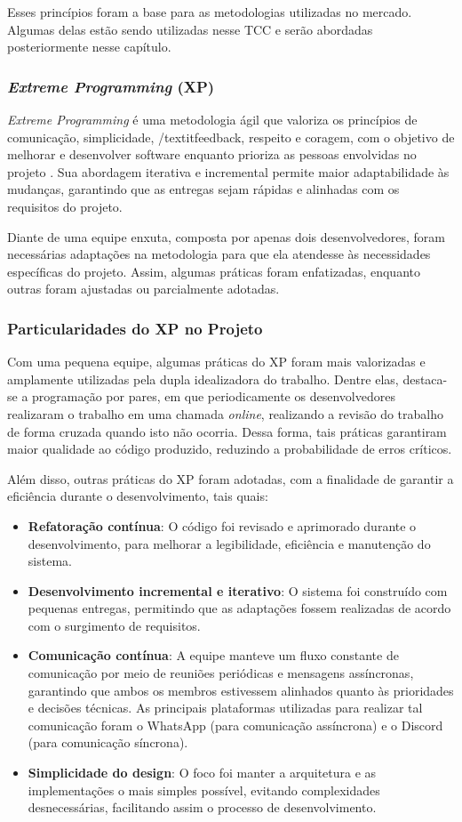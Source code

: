 Esses princípios foram a base para as metodologias utilizadas no mercado. Algumas delas estão sendo utilizadas nesse TCC e serão abordadas posteriormente nesse capítulo.

\subsubsection{\textit{Extreme Programming} (XP)}
\textit{Extreme Programming} é uma metodologia ágil que valoriza os princípios de comunicação, simplicidade, /textit{feedback}, respeito e coragem, com o objetivo de melhorar e desenvolver software enquanto prioriza as pessoas envolvidas no projeto \cite{extremeprogramming}. Sua abordagem iterativa e incremental permite maior adaptabilidade às mudanças, garantindo que as entregas sejam rápidas e alinhadas com os requisitos do projeto. 

Diante de uma equipe enxuta, composta por apenas dois desenvolvedores, foram necessárias adaptações na metodologia para que ela atendesse às necessidades específicas do projeto. Assim, algumas práticas foram enfatizadas, enquanto outras foram ajustadas ou parcialmente adotadas.

\subsubsection{Particularidades do XP no Projeto}
Com uma pequena equipe, algumas práticas do XP foram mais valorizadas e amplamente utilizadas pela dupla idealizadora do trabalho. Dentre elas, destaca-se a programação por pares, em que periodicamente os desenvolvedores realizaram o trabalho em uma chamada \textit{online}, realizando a revisão do trabalho de forma cruzada quando isto não ocorria. Dessa forma, tais práticas garantiram maior qualidade ao código produzido, reduzindo a probabilidade de erros críticos.

Além disso, outras práticas do XP foram adotadas, com a finalidade de garantir a eficiência durante o desenvolvimento, tais quais:

\begin{itemize}
    \item \textbf{Refatoração contínua}: O código foi revisado e aprimorado durante o desenvolvimento, para melhorar a legibilidade, eficiência e manutenção do sistema.
    \item \textbf{Desenvolvimento incremental e iterativo}: O sistema foi construído com pequenas entregas, permitindo que as adaptações fossem realizadas de acordo com o surgimento de requisitos.
    \item \textbf{Comunicação contínua}: A equipe manteve um fluxo constante de comunicação por meio de reuniões periódicas e mensagens assíncronas, garantindo que ambos os membros estivessem alinhados quanto às prioridades e decisões técnicas. As principais plataformas utilizadas para realizar tal comunicação foram o WhatsApp (para comunicação assíncrona) e o Discord (para comunicação síncrona).
    \item \textbf{Simplicidade do design}: O foco foi manter a arquitetura e as implementações o mais simples possível, evitando complexidades desnecessárias, facilitando assim o processo de desenvolvimento.
\end{itemize}


